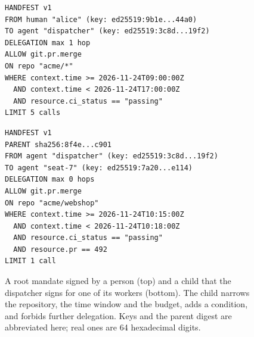 \documentclass[10pt,twocolumn]{article}
\theoremstyle{plain}
\theoremstyle{definition}
\begin{document}
\begin{figure}[t]
\begin{lstlisting}
HANDFEST v1
FROM human "alice" (key: ed25519:9b1e...44a0)
TO agent "dispatcher" (key: ed25519:3c8d...19f2)
DELEGATION max 1 hop
ALLOW git.pr.merge
ON repo "acme/*"
WHERE context.time >= 2026-11-24T09:00:00Z
  AND context.time < 2026-11-24T17:00:00Z
  AND resource.ci_status == "passing"
LIMIT 5 calls
\end{lstlisting}
\begin{lstlisting}
HANDFEST v1
PARENT sha256:8f4e...c901
FROM agent "dispatcher" (key: ed25519:3c8d...19f2)
TO agent "seat-7" (key: ed25519:7a20...e114)
DELEGATION max 0 hops
ALLOW git.pr.merge
ON repo "acme/webshop"
WHERE context.time >= 2026-11-24T10:15:00Z
  AND context.time < 2026-11-24T10:18:00Z
  AND resource.ci_status == "passing"
  AND resource.pr == 492
LIMIT 1 call
\end{lstlisting}
\caption{A root mandate signed by a person (top) and a child that the dispatcher signs for one of its workers (bottom). The child narrows the repository, the time window and the budget, adds a condition, and forbids further delegation. Keys and the parent digest are abbreviated here; real ones are 64 hexadecimal digits.}
\label{fig:example}
\end{figure}
\end{document}
